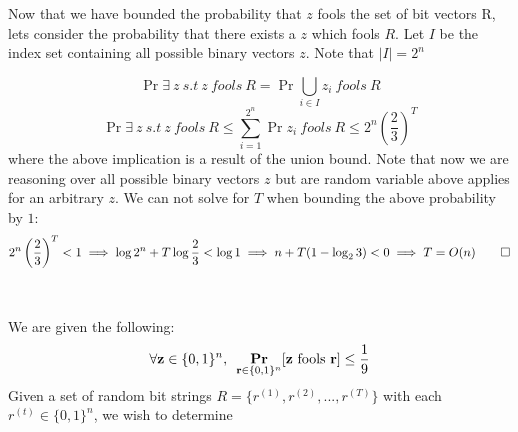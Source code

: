 \documentclass[12pt]{article}
\begin{document}
\begin{solution}
Now that we have bounded the probability that $z$ fools the set of bit vectors R, lets consider the probability that there exists a $z$ which fools $R$. Let $I$ be the index set containing all possible binary vectors $z$. Note that $|I| = 2^n$

\[
\Pr{\exists~z~s.t~z~fools~R} = \Pr{\bigcup_{i\in I} z_i~fools~R}
\]
\[
\Pr{\exists~z~s.t~z~fools~R} \leq \sum_{i=1}^{2^n}{\Pr{z_i~fools~R}} \leq 2^n\left(\frac{2}{3}\right)^T 
\]
where the above implication is a result of the union bound. Note that now we are reasoning over all possible binary vectors $z$ but are random variable above applies for an arbitrary $z$. We can not solve for $T$ when bounding the above probability by $1$:
\[
2^n\left(\frac{2}{3}\right)^T < 1 \implies \log{2^n} + T\log{\frac{2}{3}} < \log{1} \implies n + T(1 - \log_{2}{3}) < 0 \implies T = O(n) \qed
\]


\begin{solution} \

We are given the following:
\[
\forall \textbf{z} \in \{0,1\}^n, \hspace{5pt} \underset{\textbf{r} \in \{0,1\}^n}{\textbf{Pr}}[\text{\textbf{z} fools \textbf{r}}] \leq \frac{1}{9}
\]
Given a set of random bit strings $R = \{r^{(1)}, r^{(2)}, ... , r^{(T)}\}$ with each $r^{(t)} \in \{0,1\}^n$, we wish to determine 


\end{solution}
\end{solution}
\end{document}
